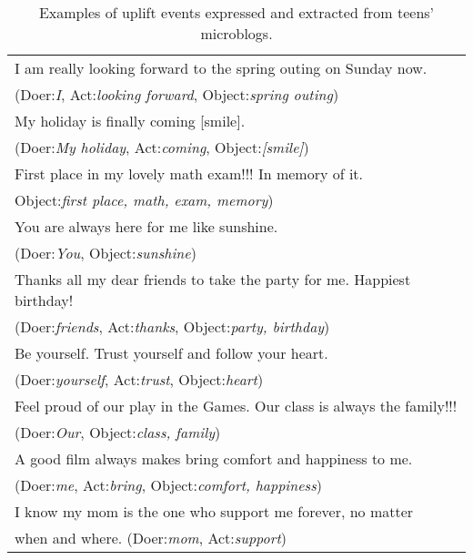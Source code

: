 \begin{table}
\begin{center}
\caption{Examples of uplift events expressed and extracted from teens' microblogs.}
\begin{tabular}{l} \hline \rowcolor{gray!40}
I am really looking forward to the spring outing on Sunday now. \\ \rowcolor{gray!40}
(Doer:\emph{I}, Act:\emph{looking forward}, Object:\emph{spring outing})\\
My holiday is finally coming [smile]. \\
(Doer:\emph{My holiday}, Act:\emph{coming}, Object:\emph{[smile]})\\ \rowcolor{gray!40}%
First place in my lovely math exam!!! In memory of it.\\ \rowcolor{gray!40}
Object:\emph{first place, math, exam, memory})\\ %
You are always here for me like sunshine. \\
(Doer:\emph{You}, Object:\emph{sunshine})\\ \rowcolor{gray!40} %
Thanks all my dear friends to take the party for me. Happiest birthday!\\ \rowcolor{gray!40}
(Doer:\emph{friends}, Act:\emph{thanks}, Object:\emph{party, birthday})\\
Be yourself. Trust yourself and follow your heart. \\
(Doer:\emph{yourself}, Act:\emph{trust}, Object:\emph{heart})\\ \rowcolor{gray!40} %
Feel proud of our play in the Games. Our class is always the family!!!\\ \rowcolor{gray!40}
(Doer:\emph{Our}, Object:\emph{class, family})\\
A good film always makes bring comfort and happiness to me.\\
(Doer:\emph{me}, Act:\emph{bring}, Object:\emph{comfort, happiness})\\ \rowcolor{gray!40}%
I know my mom is the one who support me forever, no matter \\ \rowcolor{gray!40}
when and where. (Doer:\emph{mom}, Act:\emph{support})\\ \hline
\end{tabular}
\label{tab:uplifts}
\end{center}
\end{table}

